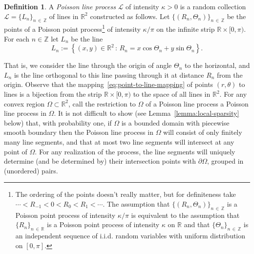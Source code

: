 \documentclass[10pt]{amsart}
\theoremstyle{definition}\newtheorem{defi}[theo]{Definition}\newtheorem{rema}[theo]{Remark}\newtheorem{exam}[theo]{Example}\newtheorem{exem}[theo]{Example}\newtheorem{nota}[theo]{Notation}
\newcommand{\zz}[1]{\mathbb #1}
\begin{document}
\begin{defi}\label{definition:plp}
A \emph{Poisson line process} $\mathcal{L}$ of intensity $\kappa >0$ is a random collection $\mathcal{L}=\{L_{n} \}_{n\,\in\,\zz{Z}}$ of lines in $\zz{R}^{2}$ constructed as follows. Let $\{(R_{n},\Theta_{n})\}_{n\,\in\,\zz{Z}}$ be the points of a Poisson point process\footnote{The ordering of the points doesn't really matter, but for definiteness take $\dotsb <R_{-1}<0<R_{0}<R_{1}<\dotsb$. The assumption that $\{(R_{n},\Theta_{n})\}_{n\,\in\,\zz{Z}}$ is a Poisson point process of intensity $\kappa /\pi$ is equivalent to the assumption that $\{R_{n} \}_{n\,\in\, \zz{R}}$ is a Poisson point process of intensity $\kappa$ on $\zz{R}$ and that $\{\Theta_{n} \}_{n\,\in\,\zz{Z}}$ is an independent sequence of i.i.d. random variables with uniform distribution on $[0,\pi]$.} of intensity $\kappa /\pi $ on the infinite strip $\zz{R}\times [0,\pi)$. For each $n\in \zz{Z}$ let $L_{n}$ be the line
\begin{equation}\label{eq:point-to-line-mapping}
L_{n}:=\left\{(x,y)\in \zz{R}^{2}\,:\, R_{n}=x \cos \Theta_{n}+y\sin \Theta_{n}\right\}.
\end{equation}
\end{defi}

That is, we consider the line through the origin of angle $\Theta_n$ to the horizontal, and $L_n$ is the line orthogonal to this line passing through it at distance $R_n$ from the origin. Observe that the mapping~\eqref{eq:point-to-line-mapping} of points $(r,\theta)$ to lines is a bijection from the strip $\zz{R}\times[0,\pi)$ to the space of all lines in $\zz{R}^{2}$. For any convex region $\Omega \subset \zz{R}^{2}$, call the restriction to $\Omega$ of a Poisson line process a Poisson line process in $\Omega$. It is not difficult to show (see Lemma~\ref{lemma:local-sparsity} below) that, with probability one, if $\Omega$ is a bounded domain with piecewise smooth boundary then the Poisson line process in $\Omega$ will consist of only finitely many line segments, and that at most two line segments will intersect at any point of $\Omega$. For any realization of the process, the line segments will uniquely determine (and be determined by) their intersection points with $\partial \Omega$, grouped in (unordered) pairs.
\end{document}
